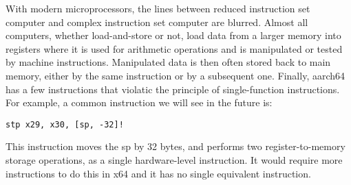 \documentclass[letterpaper, 12pt]{book}
\begin{document}
With modern microprocessors, the lines between \gls{reduced instruction set computer} and \gls{complex instruction set computer} are
blurred. Almost all computers, whether \gls{load-and-store} or not, load data from a larger memory into registers 
where it is used for arithmetic operations and is manipulated or tested by machine instructions. Manipulated data 
is then often stored back to main memory, either by the same instruction or by a subsequent one. Finally, 
\gls{aarch64} has a few instructions that violatic the principle of single-function instructions. For example, 
a common instruction we will see in the future is:
%
\begin{verbatim}
stp x29, x30, [sp, -32]!
\end{verbatim}
%
This instruction moves the \gls{sp} by 32 bytes, and performs two register-to-memory 
storage operations, as a single hardware-level instruction. It would require more instructions to 
do this in \gls{x64} and it has no single equivalent instruction. 


\printglossary[type=\acronymtype]

\printglossary
 
\end{document}

